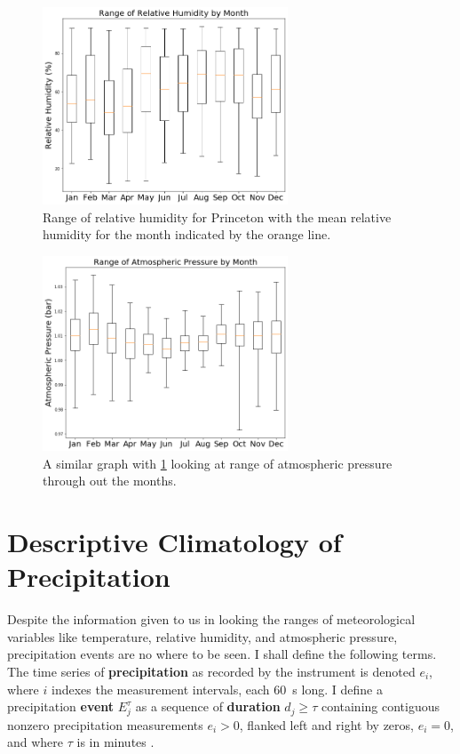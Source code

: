 \documentclass[11pt]{report}
\begin{document}
\clearpage
\begin{figure}[t]
	\centering
	\includegraphics[width=0.65\textwidth]{Figures/RH_range.png}
	\caption[Range of Relative Humidity in Princeton (2017- 2021)]{\label{RH_range} Range of relative humidity for Princeton with the mean relative humidity for the month indicated by the orange line.}
\end{figure}
\begin{figure}[b]
	\centering
	\includegraphics[width=0.65\textwidth]{Figures/AP_range.png}
	\caption[Range of Atmospheric Pressure in Princeton (2017- 2021) ]{\label{AP_range}
		A similar graph with \ref{RH_range} looking at range of atmospheric pressure through out the months.  }
\end{figure}
\clearpage
\section{Descriptive Climatology of Precipitation}\label{sec:dcp}
Despite the information given to us in looking the ranges of meteorological variables like temperature, relative humidity, and atmospheric pressure, precipitation events are no where to be seen. 
I shall define the following terms. The time series of
\textbf{precipitation} as recorded by the instrument is denoted $e_i$, where
$i$ indexes the measurement intervals, each 60~s long. I define a
precipitation \textbf{event} $E_j^\tau $ as a sequence of \textbf{duration}
$d_j\ge \tau$ containing contiguous nonzero precipitation measurements
$e_i>0$, flanked left and right by zeros, $e_i=0$, and where $\tau$ is in
minutes \cite{Eagleson}.
\end{document}
